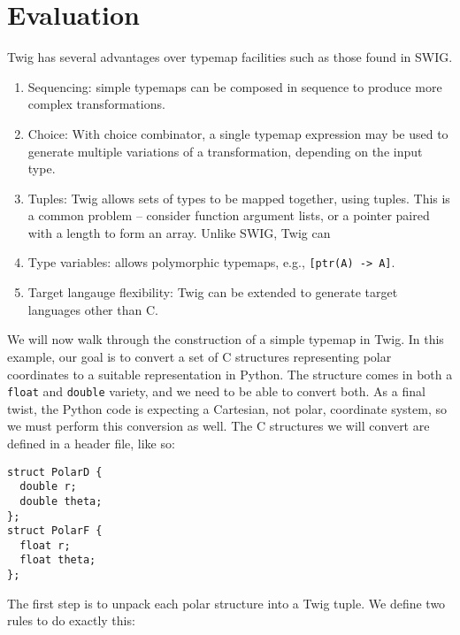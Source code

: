 
\section{Evaluation}

Twig has several advantages over typemap facilities such as those found in SWIG.

\begin{enumerate}

\item Sequencing: simple typemaps can be composed in sequence to produce more complex transformations.

\item Choice: With choice combinator, a single typemap expression may be used to generate multiple variations of a transformation, depending on the input type.

\item Tuples: Twig allows sets of types to be mapped together, using tuples. This is a common problem -- consider function argument lists, or a pointer paired with a length to form an array. Unlike SWIG, Twig can 

\item Type variables: allows polymorphic typemaps, e.g., \texttt{[ptr(A) -> A]}.
  
\item Target langauge flexibility: Twig can be extended to generate target languages other than C.

\end{enumerate}

We will now walk through the construction of a simple typemap in Twig. In this example, our goal is to convert a set of C structures representing polar coordinates to a suitable representation in Python. The structure comes in both a \texttt{float} and \texttt{double} variety, and we need to be able to convert both. As a final twist, the Python code is expecting a Cartesian, not polar, coordinate system, so we must perform this conversion as well. The C structures we will convert are defined in a header file, like so:

\begin{verbatim}
struct PolarD {
  double r;
  double theta;
};
struct PolarF {
  float r;
  float theta;
};
\end{verbatim}

The first step is to unpack each polar structure into a Twig tuple. We define two rules to do exactly this:

